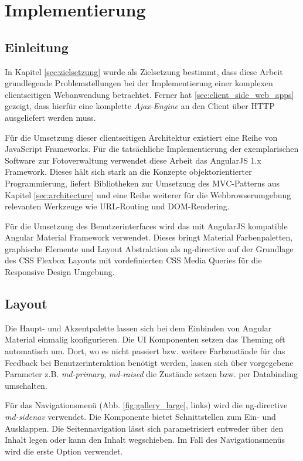 \chapter{Implementierung}

\section{Einleitung}

In Kapitel \ref{sec:zielsetzung} wurde als Zielsetzung bestimmt, dass diese Arbeit grundlegende Problemstellungen bei der Implementierung einer komplexen clientseitigen Webanwendung betrachtet. Ferner hat \ref{sec:client_side_web_apps} gezeigt, dass hierfür eine komplette \textit{Ajax-Engine} an den Client über HTTP ausgeliefert werden muss.

Für die Umsetzung dieser clientseitigen Architektur existiert eine Reihe von JavaScript Frameworks. Für die tatsächliche Implementierung der exemplarischen Software zur Fotoverwaltung verwendet diese Arbeit das AngularJS 1.x Framework. Dieses hält sich stark an die Konzepte objektorientierter Programmierung, liefert Bibliotheken zur Umsetzung des MVC-Patterns aus Kapitel \ref{sec:architecture} und eine Reihe weiterer für die Webbrowserumgebung relevanten Werkzeuge wie URL-Routing und DOM-Rendering.

Für die Umsetzung des Benutzerinterfaces wird das mit AngularJS kompatible Angular Material Framework verwendet. Dieses bringt Material Farbenpaletten, graphische Elemente und Layout Abstraktion als \gls{ng-directive} auf der Grundlage des CSS Flexbox Layouts mit vordefinierten CSS Media Queries für die Responsive Design Umgebung.

\section{Layout}

Die Haupt- und Akzentpalette lassen sich bei dem Einbinden von Angular Material einmalig konfigurieren. Die UI Komponenten setzen das Theming oft automatisch um.
Dort, wo es nicht passiert bzw. weitere Farbzustände für das Feedback bei Benutzerinteraktion benötigt werden, lassen sich über vorgegebene Parameter z.B. \textit{md-primary}, \textit{md-raised} die Zustände setzen bzw. per Databinding umschalten.

Für das Navigationsmenü (Abb. \ref{fig:gallery_large}, links) wird die \gls{ng-directive} \textit{md-sidenav} verwendet. Die Komponente bietet Schnittstellen zum Ein- und Ausklappen. Die Seitennavigation lässt sich parametrisiert entweder über den Inhalt legen oder kann den Inhalt wegschieben. Im Fall des Navigationsmenüs wird die erste Option verwendet.

